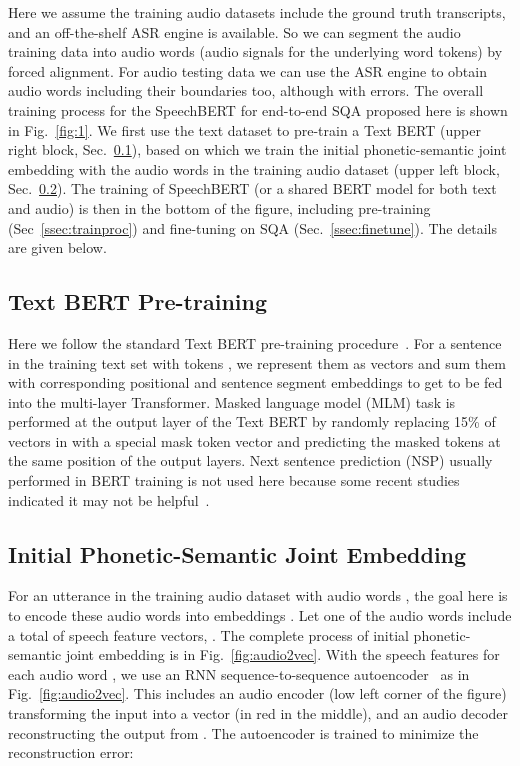 \documentclass[a4paper]{article}
\begin{document}
Here we assume the training audio datasets include the ground truth transcripts, and an off-the-shelf ASR engine is available. So we can segment the audio training data into audio words (audio signals for the underlying word tokens) by forced alignment. For audio testing data we can use the ASR engine to obtain audio words including their boundaries too, although with errors. The overall training process for the SpeechBERT for end-to-end SQA proposed here is shown in Fig.~\ref{fig:1}. We first use the text dataset to pre-train a Text BERT (upper right block, Sec.~\ref{ssec:bert}), based on which we train the initial phonetic-semantic joint embedding with the audio words in the training audio dataset (upper left block, Sec.~\ref{ssec:sse}). The training of SpeechBERT (or a shared BERT model for both text and audio) is then in the bottom of the figure, including pre-training (Sec~\ref{ssec:trainproc}) and fine-tuning on SQA (Sec.~\ref{ssec:finetune}). The details are given below.


\vspace{-6pt}
\subsection{Text BERT Pre-training}
\label{ssec:bert}
\vspace{-3pt}

Here we follow the standard Text BERT pre-training procedure~\cite{devlin2019bert}. For a sentence in the training text set with  tokens , we represent them as vectors  and sum them with corresponding positional and sentence segment embeddings to get  to be fed into the multi-layer Transformer. Masked language model (MLM) task is performed at the output layer of the Text BERT by randomly replacing 15\% of vectors in  with a special mask token vector and predicting the masked tokens at the same position of the output layers. Next sentence prediction (NSP) usually performed in BERT training is not used here because some recent studies indicated it may not be helpful~\cite{xlm2019, spanbert2019, xlnet2019, roberta2019}.

\vspace{-8pt}
\subsection{Initial Phonetic-Semantic Joint Embedding}
\label{ssec:sse}
\vspace{-3pt}
For an utterance in the training audio dataset with  audio words , the goal here is to encode these  audio words into  embeddings . Let one of the audio words include a total of  speech feature vectors, . The complete process of initial phonetic-semantic joint embedding is in Fig.~\ref{fig:audio2vec}. 
With the speech features for each audio word , we use an RNN sequence-to-sequence autoencoder~\cite{chung2016audio} as in Fig.~\ref{fig:audio2vec}. This includes an audio encoder (low left corner of the figure) transforming the input  into a vector  (in red in the middle), and an audio decoder reconstructing the output  from . The autoencoder is trained to minimize the reconstruction error:
\vspace{-10pt}
\end{document}
